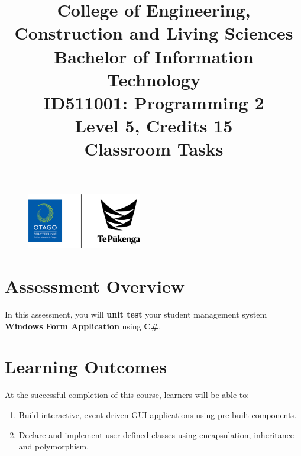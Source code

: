 \documentclass{article}
\author{}
\begin{document}
\begin{figure}
    \centering
    \includegraphics[width=50mm]{../../resources/img/logo.png}
\end{figure}

\title{College of Engineering, Construction and Living Sciences\\Bachelor of Information Technology\\ID511001: Programming 2\\Level 5, Credits 15\\\textbf{Classroom Tasks}}
\date{}
\maketitle

\section*{Assessment Overview}
In this assessment, you will \textbf{unit test} your student management system \textbf{Windows Form Application} using \textbf{C\#}. 

\section*{Learning Outcomes}
At the successful completion of this course, learners will be able to:
\begin{enumerate}
    \item Build interactive, event-driven GUI applications using pre-built components.
    \item Declare and implement user-defined classes using encapsulation, inheritance and polymorphism.
\end{enumerate}
\end{document}
